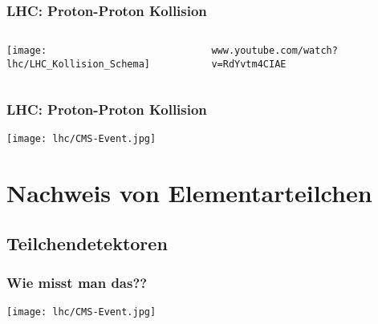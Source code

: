 {  %
  \begin{frame}
    \frametitle{LHC: Proton-Proton Kollision}
    \begin{columns}
      \begin{column}{0.5\textwidth}
        \centering
      \texttt{[image: lhc/LHC\_Kollision\_Schema]}
      \end{column}
      \begin{column}{0.5\textwidth}
        \begin{block}{}
          \centering
          \texttt{\scriptsize www.youtube.com/watch?v=RdYvtm4CIAE}
        \end{block}
      \end{column}
    \end{columns}
  \end{frame}

  \begin{frame}
    \frametitle{LHC: Proton-Proton Kollision}
    \begin{center}
      \texttt{[image: lhc/CMS-Event.jpg]}
    \end{center}
  \end{frame}


  \section{Nachweis von Elementarteilchen}
  \subsection{Teilchendetektoren}
  \begin{frame}
    \frametitle{Wie misst man das??}
    \begin{center}
      \texttt{[image: lhc/CMS-Event.jpg]}
    \end{center}
  \end{frame}
}

